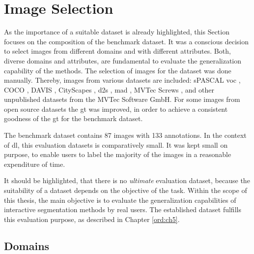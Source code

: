 
\section{Image Selection}\label{ord:ch4:sec4}

As the importance of a suitable dataset is already highlighted, this Section focuses on the composition of the benchmark dataset.
It was a conscious decision to select images from different domains and with different attributes.
Both, diverse domains and attributes, are fundamental to evaluate the generalization capability of the methods.
The selection of images for the dataset was done manually.
Thereby, images from various datasets are included: sPASCAL \gls{voc} \cite{Eve20-PascalVOC}, COCO \cite{Lin14-Coco}, DAVIS \cite{Per16-DAVIS}, CityScapes \cite{Cor16-Cityscapes}, \gls{d2s} \cite{Paddo18-D2S}, \gls{mad} \cite{Bergmann19-MAD}, MVTec Screws \cite{UFN19-Screws}, and other unpublished datasets from the MVTec Software GmbH.
For some images from open source datasets the \gls{gt} was improved, in order to achieve a consistent goodness of the \gls{gt} for the benchmark dataset.

The benchmark dataset contains 87 images with 133 annotations.
In the context of \gls{dl}, this evaluation datasets is comparatively small.
It was kept small on purpose, to enable users to label the majority of the images in a reasonable expenditure of time.
 
It should be highlighted, that there is no \textit{ultimate} evaluation dataset, because the suitability of a dataset depends on the objective of the task.
Within the scope of this thesis, the main objective is to evaluate the generalization capabilities of interactive segmentation methods by real users.
The established dataset fulfills this evaluation purpose, as described in Chapter \ref{ord:ch5}.


\subsection{Domains}\label{ord:ch4:sec2:subsec1}

